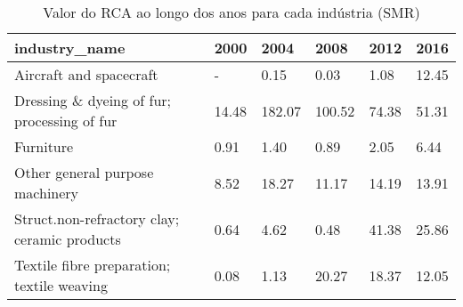 \begin{table}
\centering
\caption{Valor do RCA ao longo dos anos para cada indústria (SMR)}
\begin{tabular}{p{6cm}p{1.5cm}p{1.5cm}p{1.5cm}p{1.5cm}p{1.5cm}}
\toprule
                               industry\_name &  2000 &   2004 &   2008 &  2012 &  2016 \\
\midrule
                     Aircraft and spacecraft &     - &   0.15 &   0.03 &  1.08 & 12.45 \\
 Dressing \& dyeing of fur; processing of fur & 14.48 & 182.07 & 100.52 & 74.38 & 51.31 \\
                                   Furniture &  0.91 &   1.40 &   0.89 &  2.05 &  6.44 \\
             Other general purpose machinery &  8.52 &  18.27 &  11.17 & 14.19 & 13.91 \\
Struct.non-refractory clay; ceramic products &  0.64 &   4.62 &   0.48 & 41.38 & 25.86 \\
  Textile fibre preparation; textile weaving &  0.08 &   1.13 &  20.27 & 18.37 & 12.05 \\
\bottomrule
\end{tabular}
\end{table}
